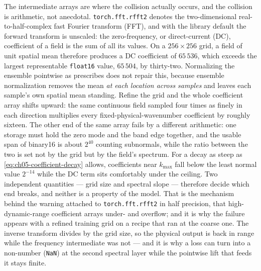 The intermediate arrays are where the collision actually occurs, and the collision is
arithmetic, not anecdotal. \texttt{torch.fft.rfft2} denotes the two-dimensional
real-to-half-complex fast Fourier transform (FFT), and with the library default the forward
transform is unscaled: the
zero-frequency, or direct-current (DC), coefficient of a field is the sum of all its values.
On a $256\times256$ grid, a field of unit spatial mean therefore produces a DC coefficient of
$65\,536$, which exceeds the largest representable \texttt{float16} value, $65\,504$, by
thirty-two. Normalizing the ensemble pointwise as
 prescribes does not repair
this, because ensemble normalization removes the mean \emph{at each location across samples}
and leaves each sample's own spatial mean standing. Refine the grid and the whole coefficient
array shifts upward: the same continuous field sampled four times as finely in each
direction multiplies every fixed-physical-wavenumber coefficient by roughly sixteen. The
other end of the same array fails by a different arithmetic: one storage must hold the zero
mode and the band edge together, and the usable span of binary16 is about $2^{40}$ counting
subnormals, while the ratio between the two is set not by the grid but by the field's
spectrum. For a decay as steep as \eqref{eq:ch05-coefficient-decay} allows, coefficients near
$k_{\max}$ fall below the least normal value $2^{-14}$ while the DC term sits comfortably
under the ceiling. Two independent quantities --- grid size and spectral slope --- therefore
decide which end breaks, and neither is a property of the model. That is
the mechanism behind the warning attached to \texttt{torch.fft.rfft2} in half precision, that
high-dynamic-range coefficient arrays under- and overflow; and it is why the failure appears
with a refined training grid on a recipe that ran at the coarse one. The inverse transform
divides by the grid size, so the physical output is back in range while the frequency
intermediate was not --- and it is why a loss can turn into a non-number (\texttt{NaN}) at
the second spectral layer while the pointwise lift that feeds it stays finite.

